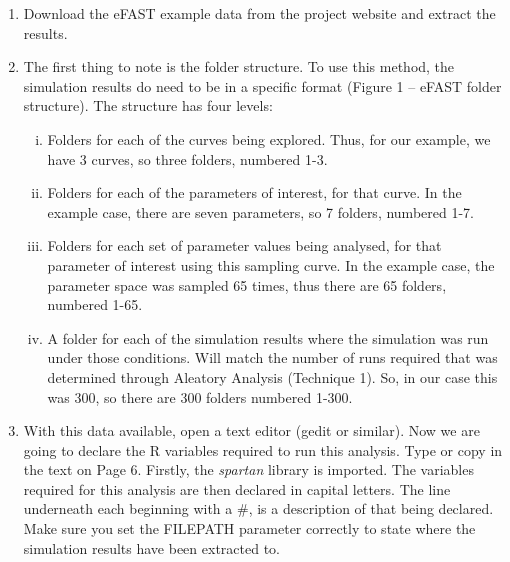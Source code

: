 \documentclass[a4paper,11pt]{article}
\begin{document}
\begin{enumerate}
\item Download the eFAST example data from the project website and extract the results.
\item The first thing to note is the folder structure.  To use this method, the simulation results do need to be in a specific format (Figure 1 – eFAST folder structure).  The structure has four levels:
\begin{enumerate}[(i)]
\item Folders for each of the curves being explored. Thus, for our example, we have 3 curves, so three folders, numbered 1-3.
\item Folders for each of the parameters of interest, for that curve. In the example case, there are seven parameters, so 7 folders, numbered 1-7.
\item Folders for each set of parameter values being analysed, for that parameter of interest using this sampling curve. In the example case, the parameter space was sampled 65 times, thus there are 65 folders, numbered 1-65.
\item A folder for each of the simulation results where the simulation was run under those conditions. Will match the number of runs required that was determined through Aleatory Analysis (Technique 1). So, in our case this was 300, so there are 300 folders numbered 1-300.
\end{enumerate}
\item With this data available, open a text editor (gedit or similar).  Now we are going to declare the R variables required to run this analysis.  Type or copy in the text on Page 6.  Firstly, the \textit{spartan} library is imported. The variables required for this analysis are then declared in capital letters. The line underneath each beginning with a \#, is a description of that being declared. Make sure you set the FILEPATH parameter correctly to state where the simulation results have been extracted to.


\end{enumerate}
\end{document}
